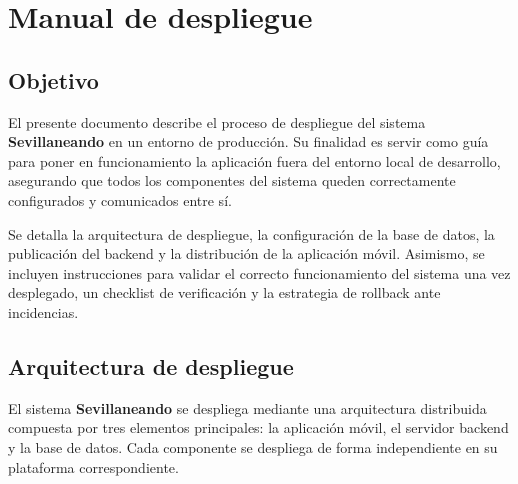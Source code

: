 \chapter{Manual de despliegue}\label{cap:manual_despliegue}

\section{Objetivo}

El presente documento describe el proceso de despliegue del sistema \textbf{Sevillaneando} en un entorno de producción. Su finalidad es servir como guía para poner en funcionamiento la aplicación fuera del entorno local de desarrollo, asegurando que todos los componentes del sistema queden correctamente configurados y comunicados entre sí.

Se detalla la arquitectura de despliegue, la configuración de la base de datos, la publicación del backend y la distribución de la aplicación móvil. Asimismo, se incluyen instrucciones para validar el correcto funcionamiento del sistema una vez desplegado, un checklist de verificación y la estrategia de rollback ante incidencias.

\section{Arquitectura de despliegue}

El sistema \textbf{Sevillaneando} se despliega mediante una arquitectura distribuida compuesta por tres elementos principales: la aplicación móvil, el servidor backend y la base de datos. Cada componente se despliega de forma independiente en su plataforma correspondiente.


